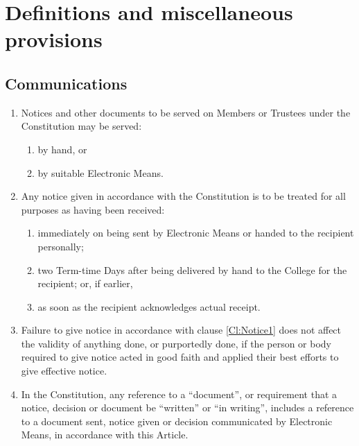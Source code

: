 \documentclass[11pt,a4paper, oneside]{memoir}
\begin{document}
	\chapter{Definitions and miscellaneous provisions}
	\section{Communications} \label{Art:Communications}
	\begin{enumerate}
		\item \label{Cl:Notice1} Notices and other documents to be served on Members or Trustees under the Constitution may be served:
		\begin{enumerate}
			\item by hand, or
			\item by suitable Electronic Means.
		\end{enumerate}
		\item Any notice given in accordance with the Constitution is to be treated for all purposes as having been received:
		\begin{enumerate}
			\item immediately on being sent by Electronic Means or handed to the recipient personally;
			\item two Term-time Days after being delivered by hand to the College for the recipient; or, if earlier,
			\item as soon as the recipient acknowledges actual receipt.
		\end{enumerate}
		\item Failure to give notice in accordance with clause \ref{Cl:Notice1} does not affect the validity of anything done, or purportedly done, if the person or body required to give notice acted in good faith and applied their best efforts to give effective notice.
		\item In the Constitution, any reference to a ``document'', or requirement that a notice, decision or document be ``written'' or ``in writing'', includes a reference to a document sent, notice given or decision communicated by Electronic Means, in accordance with this Article.
	\end{enumerate}
\end{document}
